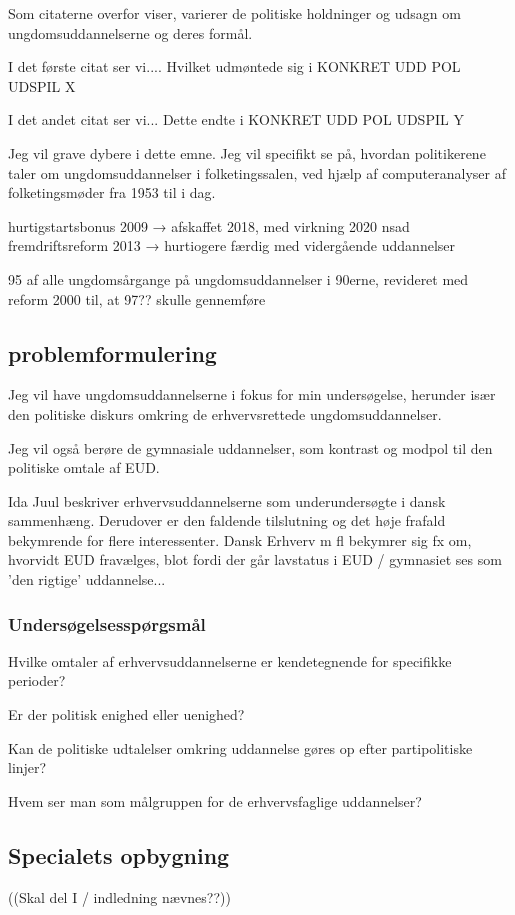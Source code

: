 Som citaterne overfor viser, varierer de politiske holdninger og udsagn om ungdomsuddannelserne og deres formål.

I det første citat ser vi....
Hvilket udmøntede sig i KONKRET UDD POL UDSPIL X

I det andet citat ser vi...
Dette endte i KONKRET UDD POL UDSPIL Y

Jeg vil grave dybere i dette emne.
Jeg vil specifikt se på, hvordan politikerene taler om ungdomsuddannelser i folketingssalen, ved hjælp af computeranalyser af folketingsmøder fra 1953 til i dag.

hurtigstartsbonus 2009 → afskaffet 2018, med virkning 2020
nsad
fremdriftsreform 2013 → hurtiogere færdig med vidergående uddannelser


95 \perc af alle ungdomsårgange på ungdomsuddannelser i 90erne, revideret med reform 2000 til, at 97?? skulle gennemføre

\subsection{problemformulering}

Jeg vil have ungdomsuddannelserne i fokus for min undersøgelse, herunder især den politiske diskurs omkring de erhvervsrettede ungdomsuddannelser.

Jeg vil også berøre de gymnasiale uddannelser, som kontrast og modpol til den politiske omtale af EUD.

Ida Juul  beskriver erhvervsuddannelserne som underundersøgte i dansk sammenhæng.
Derudover er den faldende tilslutning og det høje frafald bekymrende for flere interessenter.
Dansk Erhverv m fl bekymrer sig fx om, hvorvidt EUD fravælges, blot fordi der går lavstatus i EUD / gymnasiet ses som 'den rigtige' uddannelse...

\subsubsection{Undersøgelsesspørgsmål}

Hvilke omtaler af erhvervsuddannelserne er kendetegnende for specifikke perioder?

Er der politisk enighed eller uenighed?

Kan de politiske udtalelser omkring uddannelse gøres op efter partipolitiske linjer?

Hvem ser man som målgruppen for de erhvervsfaglige uddannelser?

\subsection{Specialets opbygning}
((Skal del I / indledning nævnes??))

